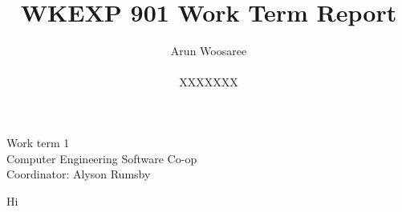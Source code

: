 \documentclass[letterpaper,12pt]{article}
\title{WKEXP 901 Work Term Report}
\author{Arun Woosaree \\ \\  XXXXXXX}
\begin{document}
\begin{titlepage}
\maketitle
\thispagestyle{empty}
\centering
\large
\vspace{1cm}
Work term 1\\
\vspace{1cm}
Computer Engineering Software Co-op \\
\vspace{1cm}
Coordinator: Alyson Rumsby
\end{titlepage}
Hi
% 
\end{document}

